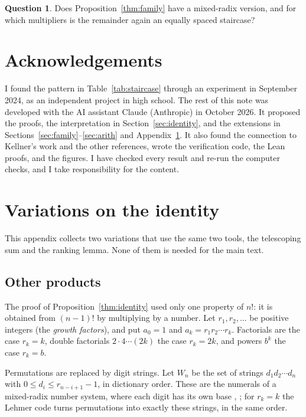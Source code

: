 \documentclass[11pt]{amsart}
\theoremstyle{plain}
\theoremstyle{definition}
\newtheorem{question}[theorem]{Question}
\theoremstyle{remark}
\begin{document}
\begin{question}
Does Proposition~\ref{thm:family} have a mixed-radix version, and for which
multipliers is the remainder again an equally spaced staircase?
\end{question}

\section*{Acknowledgements}

I found the pattern in Table~\ref{tab:staircase} through an experiment in
September 2024, as an independent project in high school. The rest of this note
was developed with the AI assistant Claude (Anthropic) in October 2026. It
proposed the proofs, the interpretation in Section~\ref{sec:identity}, and the
extensions in Sections~\ref{sec:family}--\ref{sec:arith} and
Appendix~\ref{app:var}. It also found the connection to Kellner's work and the
other references, wrote the verification code, the Lean proofs, and the
figures. I have checked every result and re-run the computer checks, and I
take responsibility for the content.

\appendix
\section{Variations on the identity}\label{app:var}

This appendix collects two variations that use the same two tools, the
telescoping sum and the ranking lemma. None of them is needed for the main
text.

\subsection{Other products}\label{sec:mixed}
The proof of Proposition~\ref{thm:identity} used only one property of $n!$: it
is obtained from $(n-1)!$ by multiplying by a number. Let $r_1,r_2,\dots$ be
positive integers (the \emph{growth factors}), and put $a_0=1$ and
$a_k=r_1r_2\cdots r_k$. Factorials are the case $r_k=k$, double factorials
$2\cdot4\cdots(2k)$ the case $r_k=2k$, and powers $b^k$ the case $r_k=b$.

Permutations are replaced by digit strings. Let $W_n$ be the set of strings
$d_1d_2\cdots d_n$ with $0\le d_i\le r_{n-i+1}-1$, in dictionary order. These
are the numerals of a mixed-radix number system, where each digit has its own
base \cite[\S4.1]{TAOCP2}, \cite{Fraenkel}; for $r_k=k$ the Lehmer code turns
permutations into exactly these strings, in the same order.
\end{document}
